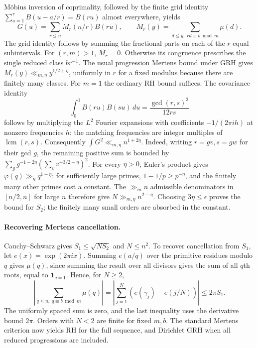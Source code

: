M\"obius inversion of coprimality, followed by the finite grid identity \(\sum_{a=1}^r B(u-a/r)=B(ru)\) almost everywhere, yields
\[
 G(u)=\sum_{r\le n} M_r(n/r) B(ru),\qquad
 M_r(y)=\sum_{d\le y,\;rd\equiv b\bmod m}\mu(d).
\]
The grid identity follows by summing the fractional parts on each of the \(r\) equal subintervals. For \((r,m)>1\), \(M_r=0\). Otherwise its congruence prescribes the single reduced class \(br^{-1}\). The usual progression Mertens bound under GRH gives \(M_r(y)\ll_{m,\eta}y^{1/2+\eta}\), uniformly in \(r\) for a fixed modulus because there are finitely many classes. For \(m=1\) the ordinary RH bound suffices. The covariance identity
\[
 \int_0^1 B(ru)B(su)\,du=\frac{\gcd(r,s)^2}{12rs}
\]
follows by multiplying the \(L^2\) Fourier expansions with coefficients \(-1/(2\pi i h)\) at nonzero frequencies \(h\): the matching frequencies are integer multiples of \(\operatorname{lcm}(r,s)\). Consequently \(\int G^2\ll_{m,\eta} n^{1+2\eta}\). Indeed, writing \(r=gv,s=gw\) for their gcd \(g\), the remaining positive sum is bounded by
\(\sum_g g^{-1-2\eta}(\sum_v v^{-3/2-\eta})^2\).
For every \(\eta>0\), Euler's product gives \(\varphi(q)\gg_\eta q^{1-\eta}\): for sufficiently large primes, \(1-1/p\ge p^{-\eta}\), and the finitely many other primes cost a constant. The \(\gg_m n\) admissible denominators in \([n/2,n]\) for large \(n\) therefore give \(N\gg_{m,\eta} n^{2-\eta}\). Choosing \(3\eta\le\epsilon\) proves the bound for \(S_2\); the finitely many small orders are absorbed in the constant.

\paragraph{Recovering Mertens cancellation.}
Cauchy--Schwarz gives \(S_1\le\sqrt{NS_2}\) and \(N\le n^2\). To recover cancellation from \(S_1\), let \(e(x)=\exp(2\pi i x)\). Summing \(e(a/q)\) over the primitive residues modulo \(q\) gives \(\mu(q)\), since summing the result over all divisors gives the sum of all \(q\)th roots, equal to \(\mathbf1_{q=1}\). Hence, for \(N\ge2\),
\[
 \left|\sum_{q\le n,\;q\equiv b\bmod m}\mu(q)\right|
 =\left|\sum_{j=1}^N(e(\gamma_j)-e(j/N))\right|\le2\pi S_1.
\]
The uniformly spaced sum is zero, and the last inequality uses the derivative bound \(2\pi\). Orders with \(N<2\) are finite for fixed \(m,b\). The standard Mertens criterion now yields RH for the full sequence, and Dirichlet GRH when all reduced progressions are included.

